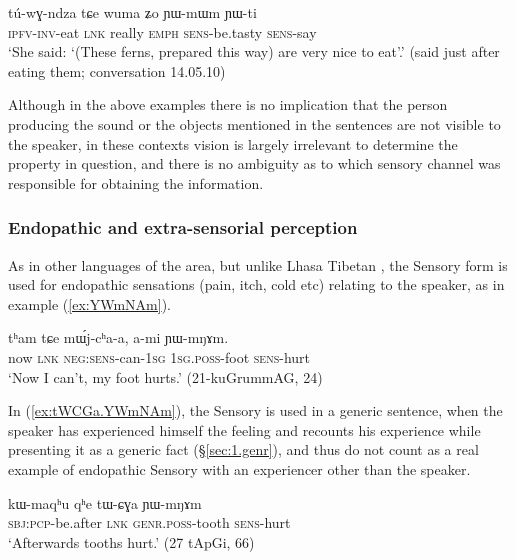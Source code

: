 \begin{exe}
\ex \label{ex:YWmWm}
\gll tú-wɣ-ndza tɕe wuma ʑo ɲɯ-mɯm ɲɯ-ti \\
\textsc{ipfv}-\textsc{inv}-eat \textsc{lnk} really \textsc{emph} \textsc{sens}-be.tasty \textsc{sens}-say \\
\glt `She said: `(These ferns, prepared this way) are very nice to eat'.' (said just after eating them; conversation 14.05.10)
\end{exe}

Although in the above examples there is no implication that the person producing the sound or the objects mentioned in the sentences are not visible to the speaker, in these contexts vision is largely irrelevant to determine the property in question, and there is no ambiguity as to which sensory channel was responsible for obtaining the information.  


\subsubsection{Endopathic and extra-sensorial perception} \label{sec:sensory.endopathic}
As in other languages of the area, but unlike Lhasa Tibetan \citep{tournadre14evidentiality}, the Sensory form is used for endopathic sensations (pain, itch, cold etc)  relating to the speaker, as in example (\ref{ex:YWmNAm}).

\begin{exe}
\ex \label{ex:YWmNAm}
\gll tʰam tɕe mɯ́j-cʰa-a, a-mi ɲɯ-mŋɤm. \\
now \textsc{lnk} \textsc{neg}:\textsc{sens}-can-\textsc{1sg} \textsc{1sg}.\textsc{poss}-foot \textsc{sens}-hurt \\
\glt `Now I can't, my foot hurts.' (21-kuGrummAG, 24)
\end{exe}


In (\ref{ex:tWCGa.YWmNAm}), the Sensory is used in a generic sentence, when the speaker has experienced himself the feeling and recounts his experience while presenting it as a generic fact (§\ref{sec:1.genr}), and thus do not count as a real example of endopathic Sensory with an experiencer other than the speaker.

\begin{exe}
\ex \label{ex:tWCGa.YWmNAm}
\gll kɯ-maqʰu qʰe tɯ-ɕɣa ɲɯ-mŋɤm \\
\textsc{sbj}:\textsc{pcp}-be.after \textsc{lnk} \textsc{genr}.\textsc{poss}-tooth \textsc{sens}-hurt \\
\glt `Afterwards tooths hurt.' (27 tApGi, 66)
\end{exe}

